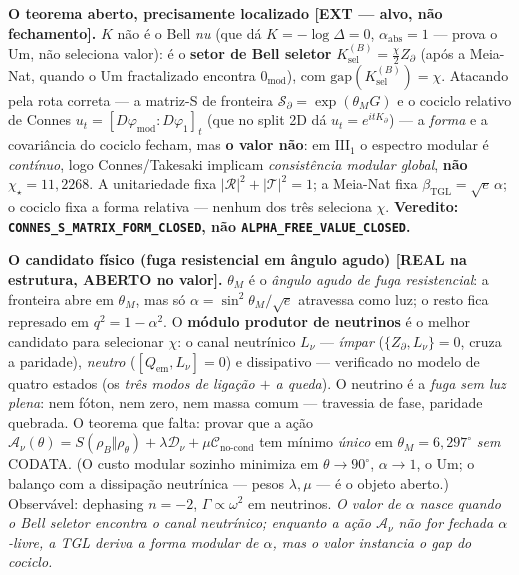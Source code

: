 \documentclass[11pt]{article}
\newcommand{\bTGL}{\beta_{\mathrm{TGL}}}\newcommand{\Msun}{M_{\odot}}\newcommand{\TGL}{\mathrm{TGL}}
\theoremstyle{definition}\newtheorem{deriv}{Derivação}
\begin{document}
\textbf{O teorema aberto, precisamente localizado \textsf{[EXT --- alvo, não fechamento]}.} $K$ não é o Bell \emph{nu} (que dá $K=-\log\Delta=0$, $\alpha_{\mathrm{abs}}=1$ --- prova o Um, não seleciona valor): é o \textbf{setor de Bell seletor} $K_{\mathrm{sel}}^{(B)}=\tfrac\chi2 Z_\partial$ (após a Meia-Nat, quando o Um fractalizado encontra $0_{\mathrm{mod}}$), com $\mathrm{gap}(K_{\mathrm{sel}}^{(B)})=\chi$. Atacando pela rota correta --- a matriz-S de fronteira $\mathcal{S}_\partial=\exp(\theta_M G)$ e o cociclo relativo de Connes $u_t=[D\varphi_{\mathrm{mod}}:D\varphi_1]_t$ (que no split 2D dá $u_t=e^{itK_\partial}$) --- a \emph{forma} e a covariância do cociclo fecham, mas \textbf{o valor não}: em $\mathrm{III}_1$ o espectro modular é \emph{contínuo}, logo Connes/Takesaki implicam \emph{consistência modular global}, \textbf{não} $\chi_\star=11{,}2268$. A unitariedade fixa $|\mathcal R|^2+|\mathcal T|^2=1$; a Meia-Nat fixa $\bTGL=\sqrt e\,\alpha$; o cociclo fixa a forma relativa --- nenhum dos três seleciona $\chi$. \textbf{Veredito: \texttt{CONNES\_S\_MATRIX\_FORM\_CLOSED}, não \texttt{ALPHA\_FREE\_VALUE\_CLOSED}.}

\textbf{O candidato físico (fuga resistencial em ângulo agudo) \textsf{[REAL na estrutura, ABERTO no valor]}.} $\theta_M$ é o \emph{ângulo agudo de fuga resistencial}: a fronteira abre em $\theta_M$, mas só $\alpha=\sin^2\theta_M/\sqrt e$ atravessa como luz; o resto fica represado em $q^2=1-\alpha^2$. O \textbf{módulo produtor de neutrinos} é o melhor candidato para selecionar $\chi$: o canal neutrínico $L_\nu$ --- \emph{ímpar} ($\{Z_\partial,L_\nu\}=0$, cruza a paridade), \emph{neutro} ($[Q_{\mathrm{em}},L_\nu]=0$) e dissipativo --- verificado no modelo de quatro estados (os \emph{três modos de ligação $+$ a queda}). O neutrino é a \emph{fuga sem luz plena}: nem fóton, nem zero, nem massa comum --- travessia de fase, paridade quebrada. O teorema que falta: provar que a ação $\mathcal A_\nu(\theta)=S(\rho_B\Vert\rho_\theta)+\lambda\mathcal D_\nu+\mu\mathcal C_{\mathrm{no\text{-}cond}}$ tem mínimo \emph{único} em $\theta_M=6{,}297^\circ$ \emph{sem} CODATA. (O custo modular sozinho minimiza em $\theta\to90^\circ$, $\alpha\to1$, o Um; o balanço com a dissipação neutrínica --- pesos $\lambda,\mu$ --- é o objeto aberto.) Observável: dephasing $n=-2$, $\Gamma\propto\omega^2$ em neutrinos. \emph{O valor de $\alpha$ nasce quando o Bell seletor encontra o canal neutrínico; enquanto a ação $\mathcal A_\nu$ não for fechada $\alpha$-livre, a TGL deriva a forma modular de $\alpha$, mas o valor instancia o gap do cociclo.}
\end{document}
